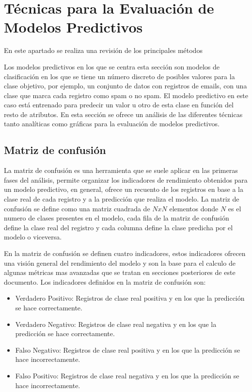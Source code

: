 \section{Técnicas para la Evaluación de Modelos Predictivos}

En este apartado se realiza una revisión de los principales métodos


Los modelos predictivos en los que se centra esta sección son modelos de clasificación en los que se tiene un número discreto de posibles valores para la clase objetivo, por ejemplo, un conjunto de datos con registros de emails, con una clase que marca cada registro como spam o no spam. El modelo predictivo en este caso está entrenado para predecir un valor u otro de esta clase en función del resto de atributos. En esta sección se ofrece un análisis de las diferentes técnicas tanto analíticas como gráficas para la evaluación de modelos predictivos.

\subsection{Matriz de confusión}

La matriz de confusión es una herramienta que se suele aplicar en las primeras fases del análisis, permite organizar los indicadores de rendimiento obtenidos para un modelo predictivo, en general, ofrece un recuento de los registros en base a la clase real de cada registro y a la predicción que realiza el modelo. La matriz de confusión se define como una matriz cuadrada de $NxN$ elementos donde $N$ es el numero de clases presentes en el modelo, cada fila de la matriz de confusión define la clase real del registro y cada columna define la clase predicha por el modelo o viceversa.

\bigbreak

En la matriz de confusión se definen cuatro indicadores, estos indicadores ofrecen una visión general del rendimiento del modelo y son la base para el calculo de algunas métricas mas avanzadas que se tratan en secciones posteriores de este documento. Los indicadores definidos en la matriz de confusión son:

\begin{itemize}
    \item Verdadero Positivo: Registros de clase real positiva y en los que la predicción se hace correctamente.
    \item Verdadero Negativo: Registros de clase real negativa y en los que la predicción se hace correctamente.
    \item Falso Negativo: Registros de clase real positiva y en los que la predicción se hace incorrectamente.
    \item Falso Positivo: Registros de clase real negativa y en los que la predicción se hace incorrectamente.
\end{itemize}

